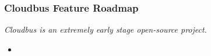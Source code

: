 \begin{frame}
	\frametitle{Cloudbus Feature Roadmap}
	\emph{Cloudbus is an extremely early stage open-source project.}
	\begin{itemize}
		\item 
	\end{itemize}
\end{frame}